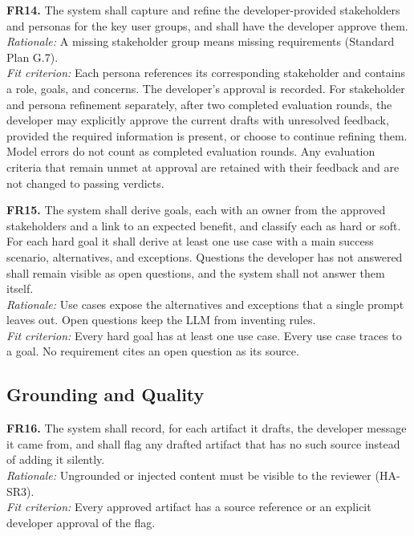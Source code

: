 \documentclass[12pt]{article}
\begin{document}
\medskip
\noindent\textbf{FR14.} The system shall capture and refine the developer-provided stakeholders and personas for the key user groups, and shall have the developer approve them.\\
\textit{Rationale:} A missing stakeholder group means missing requirements
(Standard Plan G.7).\\
\textit{Fit criterion:} Each persona references its corresponding stakeholder
and contains a role, goals, and concerns. The developer's approval is recorded.
For stakeholder and persona refinement separately, after two completed evaluation
rounds, the developer may explicitly approve the current drafts with unresolved
feedback, provided the required information is present, or choose to continue
refining them. Model errors do not count as completed evaluation rounds.
Any evaluation criteria that remain unmet at approval are retained with their
feedback and are not changed to passing verdicts.

\medskip
\noindent\textbf{FR15.} The system shall derive goals, each with an owner from the
approved stakeholders and a link to an expected benefit, and classify each as
hard or soft. For each hard goal it shall derive at least one use case with a
main success scenario, alternatives, and exceptions. Questions the developer has not answered shall remain visible as
open questions, and the system shall not answer them itself.\\
\textit{Rationale:} Use cases expose the alternatives and exceptions that a
single prompt leaves out. Open questions keep the LLM from inventing rules.\\
\textit{Fit criterion:} Every hard goal has at least one use case. Every use
case traces to a goal. No requirement cites an open question as its source.

\subsection{Grounding and Quality}

\medskip
\noindent\textbf{FR16.} The system shall record, for each artifact it drafts, the
developer message it came from, and shall flag any drafted artifact that has no
such source instead of adding it silently.\\
\textit{Rationale:} Ungrounded or injected content must be visible to the
reviewer (HA-SR3).\\
\textit{Fit criterion:} Every approved artifact has a source reference or an
explicit developer approval of the flag.
\end{document}
